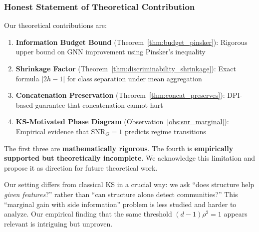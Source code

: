 \subsubsection{Honest Statement of Theoretical Contribution}

Our theoretical contributions are:

\begin{enumerate}
    \item \textbf{Information Budget Bound} (Theorem~\ref{thm:budget_pinsker}): Rigorous upper bound on GNN improvement using Pinsker's inequality

    \item \textbf{Shrinkage Factor} (Theorem~\ref{thm:discriminability_shrinkage}): Exact formula $|2h-1|$ for class separation under mean aggregation

    \item \textbf{Concatenation Preservation} (Theorem~\ref{thm:concat_preserves}): DPI-based guarantee that concatenation cannot hurt

    \item \textbf{KS-Motivated Phase Diagram} (Observation~\ref{obs:snr_marginal}): Empirical evidence that $\mathrm{SNR}_G = 1$ predicts regime transitions
\end{enumerate}

The first three are \textbf{mathematically rigorous}. The fourth is \textbf{empirically supported but theoretically incomplete}. We acknowledge this limitation and propose it as direction for future theoretical work.

\begin{remark}
Our setting differs from classical KS in a crucial way: we ask ``does structure help \textit{given features}?'' rather than ``can structure alone detect communities?'' This ``marginal gain with side information'' problem is less studied and harder to analyze. Our empirical finding that the same threshold $(d-1)\rho^2 = 1$ appears relevant is intriguing but unproven.
\end{remark}


